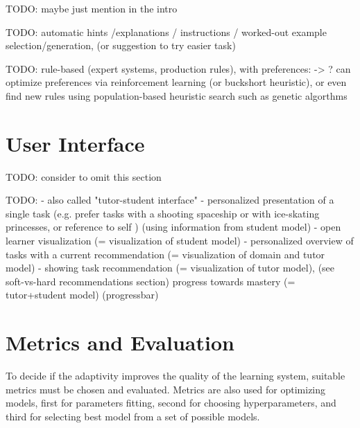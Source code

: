TODO: maybe just mention in the intro

TODO: automatic hints /explanations / instructions / worked-out example selection/generation,
  (or suggestion to try easier task)


TODO: rule-based (expert systems, production rules), with preferences:
-> ? can optimize preferences via reinforcement learning (or buckshort heuristic),
  or even find new rules using population-based heuristic search such as genetic algorthms



\section{User Interface}

TODO: consider to omit this section

TODO:
- also called "tutor-student interface"
- personalized presentation of a single task
(e.g. prefer tasks with a shooting spaceship or with ice-skating princesses,
or reference to self \cite[chapter 9]{its-domain-models})
(using information from student model)
- open learner visualization (= visualization of student model)
- personalized overview of tasks with a current recommendation (= visualization
of domain and tutor model)
- showing task recommendation (= visualization of tutor model),
  (see soft-vs-hard recommendations section)
  progress towards mastery (= tutor+student model)
  (progressbar)

\section{Metrics and Evaluation}
\label{sec:metrics-and-evaluation}


To decide if the adaptivity improves the quality of the learning system,
  suitable metrics must be chosen and evaluated.
Metrics are also used for optimizing models,
  first for parameters fitting, second for choosing hyperparameters,
  and third for selecting best model from a set of possible models.


